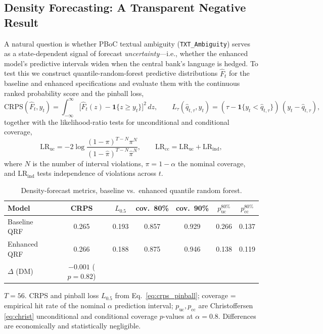 \documentclass[AER]{AEA}
\begin{document}
\subsection{Density Forecasting: A Transparent Negative Result}\label{ssec:density}
A natural question is whether PBoC textual ambiguity (\texttt{TXT\_Ambiguity})
serves as a state-dependent signal of forecast \emph{uncertainty}---i.e.,
whether the enhanced model's predictive intervals widen when the central
bank's language is hedged. To test this we construct quantile-random-forest
predictive distributions $\hat{F}_t$ for the baseline and enhanced
specifications and evaluate them with the continuous ranked probability
score and the pinball loss,
\begin{equation}
\mathrm{CRPS}(\hat{F}_t, y_t) = \int_{-\infty}^{\infty}\!
\bigl[\hat{F}_t(z) - \mathbf{1}\{z \ge y_t\}\bigr]^2 \, dz,
\qquad
L_\tau(\hat{q}_{t,\tau}, y_t) = (\tau - \mathbf{1}\{y_t < \hat{q}_{t,\tau}\})\,(y_t-\hat{q}_{t,\tau}),
\label{eq:crps_pinball}
\end{equation}
together with the \citet{christoffersen1998evaluating} likelihood-ratio
tests for unconditional and conditional coverage,
\begin{equation}
\mathrm{LR}_{\mathrm{uc}} = -2\log\frac{(1-\pi)^{T-N}\pi^{N}}{(1-\hat{\pi})^{T-N}\hat{\pi}^{N}},
\qquad
\mathrm{LR}_{\mathrm{cc}} = \mathrm{LR}_{\mathrm{uc}}+\mathrm{LR}_{\mathrm{ind}},
\label{eq:christ}
\end{equation}
where $N$ is the number of interval violations, $\pi=1-\alpha$ the nominal
coverage, and $\mathrm{LR}_{\mathrm{ind}}$ tests independence of
violations across $t$.

\begin{table}[tbp]
\caption{Density-forecast metrics, baseline vs.\ enhanced quantile random forest.\label{tab:density}}
\centering
\begin{tabular}{lcccccc}
\toprule
Model & CRPS & $L_{0.5}$ & cov.\ 80\% & cov.\ 90\% & $p_{\mathrm{uc}}^{80\%}$ & $p_{\mathrm{cc}}^{80\%}$ \\
\midrule
Baseline QRF  & 0.265 & 0.193 & 0.857 & 0.929 & 0.266 & 0.137 \\
Enhanced QRF  & 0.266 & 0.188 & 0.875 & 0.946 & 0.138 & 0.119 \\
\midrule
$\Delta$ (DM) & $-0.001$ ($p=0.82$) & & & & & \\
\bottomrule
\end{tabular}
\begin{tablenotes}
$T=56$. CRPS and pinball loss $L_{0.5}$ from Eq.~\eqref{eq:crps_pinball};
coverage = empirical hit rate of the nominal $\alpha$ prediction interval;
$p_{\mathrm{uc}}, p_{\mathrm{cc}}$ are Christoffersen
\eqref{eq:christ} unconditional and conditional coverage $p$-values at
$\alpha=0.8$. Differences are economically and statistically negligible.
\end{tablenotes}
\end{table}
\end{document}
